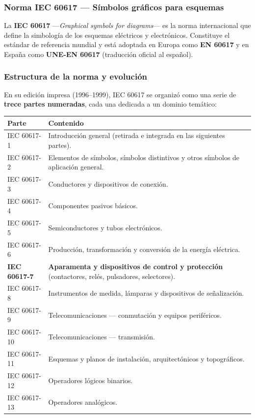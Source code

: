 \documentclass[11pt]{article}
\begin{document}
\subsubsection{Norma IEC 60617 — Símbolos gráficos para esquemas}

La \textbf{IEC 60617} —\emph{Graphical symbols for diagrams}— es la norma
internacional que define la simbología de los esquemas eléctricos y
electrónicos. Constituye el estándar de referencia mundial y está
adoptada en Europa como \textbf{EN 60617} y en España como
\textbf{UNE-EN 60617} (traducción oficial al español).

\subsubsection{Estructura de la norma y evolución}
En su edición impresa (1996–1999), IEC 60617 se organizó como una serie
de \textbf{trece partes numeradas}, cada una dedicada a un dominio
temático:

\begin{center}
	\small
	\begin{tabularx}{\linewidth}{@{}l X@{}}
		\toprule
		\textbf{Parte} & \textbf{Contenido} \\
		\midrule
		IEC 60617-1  & Introducción general (retirada e integrada en las siguientes partes).\\
		IEC 60617-2  & Elementos de símbolos, símbolos distintivos y otros símbolos de aplicación general.\\
		IEC 60617-3  & Conductores y dispositivos de conexión.\\
		IEC 60617-4  & Componentes pasivos básicos.\\
		IEC 60617-5  & Semiconductores y tubos electrónicos.\\
		IEC 60617-6  & Producción, transformación y conversión de la energía eléctrica.\\
		\textbf{IEC 60617-7}  & \textbf{Aparamenta y dispositivos de control y protección} (contactores, relés, pulsadores, selectores).\\
		IEC 60617-8  & Instrumentos de medida, lámparas y dispositivos de señalización.\\
		IEC 60617-9  & Telecomunicaciones — conmutación y equipos periféricos.\\
		IEC 60617-10 & Telecomunicaciones — transmisión.\\
		IEC 60617-11 & Esquemas y planos de instalación, arquitectónicos y topográficos.\\
		IEC 60617-12 & Operadores lógicos binarios.\\
		IEC 60617-13 & Operadores analógicos.\\
		\bottomrule
	\end{tabularx}
\end{center}
\end{document}
